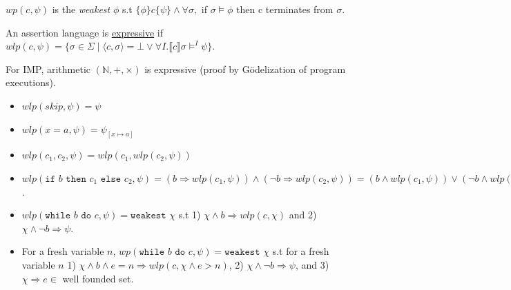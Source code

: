 \begin{definition} $wp(c, \psi)$ is the \textit{weakest} $\phi$ s.t $\{\phi\} c \{\psi\} \land \forall \sigma,$ if $\sigma \models \phi$ then c terminates from $\sigma$.
\end{definition}


An assertion language is \underline{expressive} if $wlp(c,\psi) = \{\sigma \in \Sigma \mid \langle c, \sigma\rangle = \bot \lor \forall I. \llbracket c \rrbracket \sigma \models^I\psi\}$.

For IMP, arithmetic $(\mathbb{N}, +, \times)$ is expressive (proof by G\"{o}delization of program executions).

\begin{example} 
    \begin{itemize}
        \item $wlp(skip, \psi) = \psi$
        \item $wlp(x=a, \psi) = \psi_{[x\mapsto a]}$
        \item $wlp(c_1, c_2, \psi) = wlp(c_1, wlp(c_2, \psi))$
        \item $wlp(\texttt{if } b \texttt{ then } c_1 \texttt{ else } c_2, \psi) = (b\Rightarrow wlp(c_1, \psi)) \land (\neg b \Rightarrow wlp(c_2, \psi)) = (b \land wlp(c_1, \psi)) \lor (\neg b \land wlp(c_2, \psi))$.
        \item $wlp(\texttt{while } b \texttt{ do } c, \psi) = \texttt{weakest }\chi$ s.t 1) $\chi \land b \Rightarrow wlp(c, \chi)$ and 2) $\chi \land \neg b \Rightarrow \psi$.
        \item For a fresh variable $n$, $wp(\texttt{while } b \texttt{ do } c, \psi) = \texttt{weakest }\chi$ s.t for a fresh variable $n$ 1) $\chi \land b \land e = n \Rightarrow wlp(c, \chi \land e > n)$, 2) $\chi \land \neg b \Rightarrow \psi$, and 3) $\chi \Rightarrow e \in $ well founded set.
    \end{itemize}
    
\end{example}

